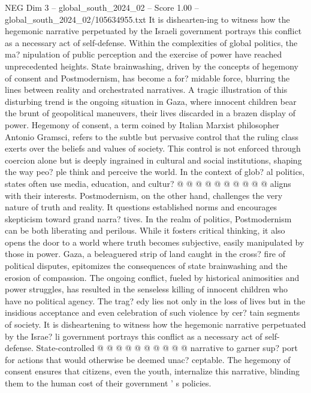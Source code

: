 \begin{textsample}{NEG Dim 3 – global\_south\_2024\_02 – Score 1.00 – global\_south\_2024\_02/105634955.txt}  \label{ex:f3_neg_099}
It is dishearten-ing to witness how the hegemonic narrative perpetuated by the Israeli government portrays this conflict as a necessary act of self-defense.
Within the complexities of global politics, the ma? nipulation of public perception and the exercise of power have reached unprecedented heights.
State brainwashing, driven by the concepts of hegemony of consent and Postmodernism, has become a for? midable force, blurring the lines between reality and orchestrated narratives.
A tragic illustration of this disturbing trend is the ongoing situation in Gaza, where innocent children bear the brunt of geopolitical maneuvers, their lives discarded in a brazen display of power.
Hegemony of consent, a term coined by Italian Marxist philosopher Antonio Gramsci, refers to the subtle but pervasive control that the ruling class exerts over the beliefs and values of society.
This control is not enforced through coercion alone but is deeply ingrained in cultural and social institutions, shaping the way peo? ple think and perceive the world.
In the context of glob? al politics, states often use media, education, and cultur? @ @ @ @ @ @ @ @ @ @ aligns with their interests.
Postmodernism, on the other hand, challenges the very nature of truth and reality.
It questions established norms and encourages skepticism toward grand narra? tives.
In the realm of politics, Postmodernism can be both liberating and perilous.
While it fosters critical thinking, it also opens the door to a world where truth becomes subjective, easily manipulated by those in power.
Gaza, a beleaguered strip of land caught in the cross? fire of political disputes, epitomizes the consequences of state brainwashing and the erosion of compassion.
The ongoing conflict, fueled by historical animosities and power struggles, has resulted in the senseless killing of innocent children who have no political agency.
The trag? edy lies not only in the loss of lives but in the insidious acceptance and even celebration of such violence by cer? tain segments of society.
It is disheartening to witness how the hegemonic narrative perpetuated by the Israe? li government portrays this conflict as a necessary act of self-defense.
State-controlled @ @ @ @ @ @ @ @ @ @ narrative to garner sup? port for actions that would otherwise be deemed unac? ceptable.
The hegemony of consent ensures that citizens, even the youth, internalize this narrative, blinding them to the human cost of their government ' s policies.

\end{textsample}
